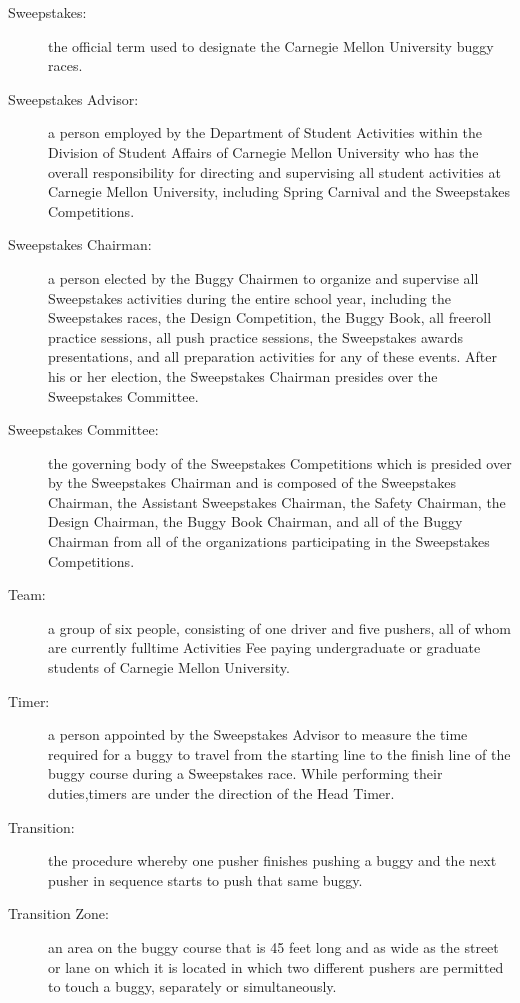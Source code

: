 \begin{description}
	\item[Sweepstakes:]
	the official term used to designate the Carnegie Mellon University buggy
	races.

	\item[Sweepstakes Advisor:]
	a person employed by the Department of Student Activities within the
	Division of Student Affairs of Carnegie Mellon University who has the overall
	responsibility for directing and supervising all student activities at Carnegie
	Mellon University, including Spring Carnival and the Sweepstakes Competitions.

	\item[Sweepstakes Chairman:]
	a person elected by the Buggy Chairmen to organize and supervise all
	Sweepstakes activities during the entire school year, including the Sweepstakes
	races, the Design Competition, the Buggy Book, all freeroll practice sessions,
	all push practice sessions, the Sweepstakes awards presentations, and all
	preparation activities for any of these events. After his or her election, the
	Sweepstakes Chairman presides over the Sweepstakes Committee.

	\item[Sweepstakes Committee:]
	the governing body of the Sweepstakes Competitions which is presided over
	by the Sweepstakes Chairman and is composed of the Sweepstakes Chairman, the
	Assistant Sweepstakes Chairman, the Safety Chairman, the Design Chairman, the
	Buggy Book Chairman, and all of the Buggy Chairman from all of the
	organizations participating in the Sweepstakes Competitions.

	\item[Team:]
	a group of six people, consisting of one driver and five pushers, all of
	whom are currently fulltime Activities Fee paying undergraduate or graduate
	students of Carnegie Mellon University.

	\item[Timer:]
	a person appointed by the Sweepstakes Advisor to measure the time required
	for a buggy to travel from the starting line to the finish line of the buggy
	course during a Sweepstakes race. While performing their duties,timers are
	under the direction of the Head Timer.

	\item[Transition:]
	the procedure whereby one pusher finishes pushing a buggy and the next
	pusher in sequence starts to push that same buggy.

	\item[Transition Zone:]
	an area on the buggy course that is 45 feet long and as wide as the street
	or lane on which it is located in which two different pushers are permitted to
	touch a buggy, separately or simultaneously.

\end{description}

